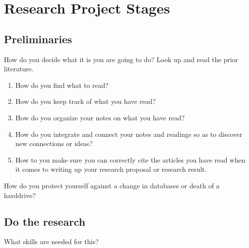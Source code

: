 \documentclass[
  letterpaper,
  DIV=11,
  numbers=noendperiod]{scrreprt}
\providecommand{\tightlist}{%
  \setlength{\itemsep}{0pt}\setlength{\parskip}{0pt}}\usepackage{longtable,booktabs,array}
\begin{document}
\section{Research Project Stages}\label{research-project-stages}

\subsection{Preliminaries}\label{preliminaries}

How do you decide what it is you are going to do? Look up and read the
prior literature.

\begin{enumerate}
\def\labelenumi{\arabic{enumi}.}
\tightlist
\item
  How do you find what to read?
\item
  How do you keep track of what you have read?
\item
  How do you organize your notes on what you have read?
\item
  How do you integrate and connect your notes and readings so as to
  discover new connections or ideas?
\item
  How to you make sure you can correctly cite the articles you have read
  when it comes to writing up your research proposal or research result.
\end{enumerate}

How do you protect yourself against a change in databases or death of a
harddrive?

\subsection{Do the research}\label{do-the-research}

What skills are needed for this?
\end{document}
